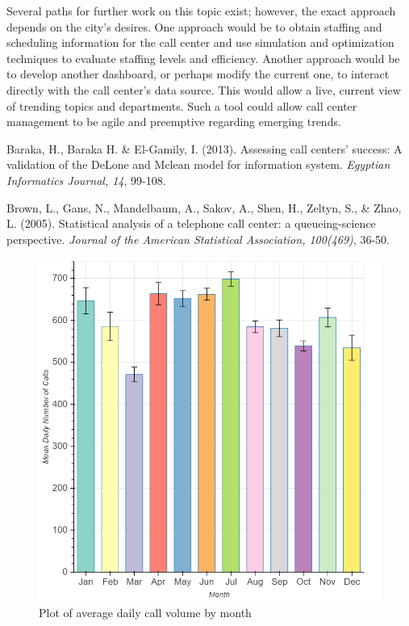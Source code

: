 \documentclass{article}
\begin{document}
Several paths for further work on this topic exist; however, the exact approach depends on the city's desires.  One approach would be to obtain staffing and scheduling information for the call center and use simulation and optimization techniques to evaluate staffing levels and efficiency.  Another approach would be to develop another dashboard, or perhaps modify the current one, to interact directly with the call center's data source.  This would allow a live, current view of trending topics and departments.  Such a tool could allow call center management to be agile and preemptive regarding emerging trends.



\begin{thebibliography}{2}

Baraka, H., Baraka H. \& El-Gamily, I. (2013). Assessing call centers' success: A validation of the DeLone and Mclean model for information system. \textit{Egyptian Informatics Journal, 14}, 99-108.

Brown, L., Gans, N., Mandelbaum, A., Sakov, A., Shen, H., Zeltyn, S., \& Zhao, L. (2005). Statistical analysis of a telephone call center: a queueing-science perspective. \textit{Journal of the American Statistical Association, 100(469)}, 36-50.

\end{thebibliography}
\newpage

\begin{figure}[p]
  \includegraphics[scale=.27]{month_bar.png}
  \caption{Plot of average daily call volume by month}
\end{figure}
\end{document}
